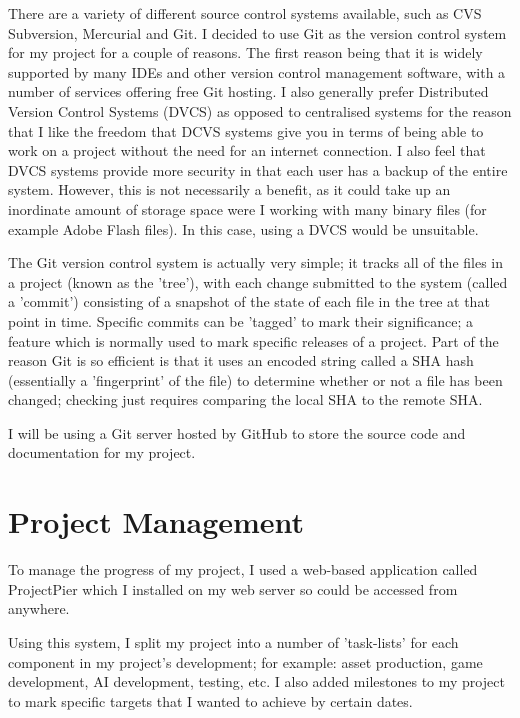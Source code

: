 \documentclass[a4paper,oneside]{report}
\begin{document}
There are a variety of different source control systems available, such as CVS Subversion, Mercurial and Git. I decided to use Git as the version control system for my project for a couple of reasons. The first reason being that it is widely supported by many IDEs and other version control management software, with a number of services offering free Git hosting. I also generally prefer Distributed Version Control Systems (DVCS) as opposed to centralised systems for the reason that I like the freedom that DCVS systems give you in terms of being able to work on a project without the need for an internet connection. I also feel that DVCS systems provide more security in that each user has a backup of the entire system. However, this is not necessarily a benefit, as it could take up an inordinate amount of storage space were I working with many binary files (for example Adobe Flash files). In this case, using a DVCS would be unsuitable.

The Git version control system is actually very simple; it tracks all of the files in a project (known as the 'tree'), with each change submitted to the system (called a 'commit') consisting of a snapshot of the state of each file in the tree at that point in time. Specific commits can be 'tagged' to mark their significance; a feature which is normally used to mark specific releases of a project. Part of the reason Git is so efficient is that it uses an encoded string called a SHA hash (essentially a 'fingerprint' of the file) to determine whether or not a file has been changed; checking just requires comparing the local SHA to the remote SHA. 

I will be using a Git server hosted by GitHub to store the source code and documentation for my project. 

\section{Project Management}

To manage the progress of my project, I used a web-based application called ProjectPier which I installed on my web server so could be accessed from anywhere.

Using this system, I split my project into a number of 'task-lists' for each component in my project's development; for example: asset production, game development, AI development, testing, etc. I also added milestones to my project to mark specific targets that I wanted to achieve by certain dates.
\end{document}
